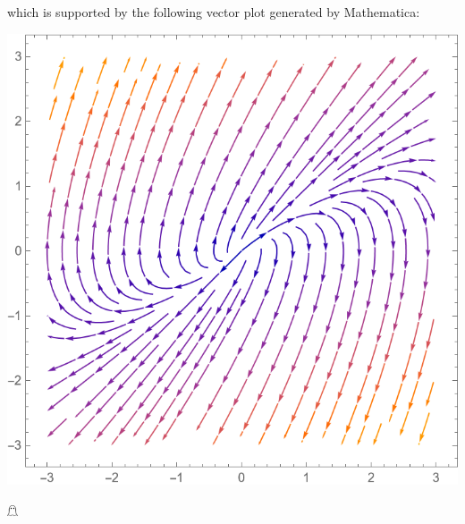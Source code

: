 \documentclass{article}
\begin{document}
\begin{itemize}
\begin{itemize}
\begin{center}
        \end{center}
        which is supported by the following vector plot generated by Mathematica:
        \begin{center}
            \includegraphics[scale = 0.5]{prob1c_stream.png}
        \end{center}
    \end{itemize}
\end{itemize}
\hfill $\mathghost$
\pagebreak
\end{document}
